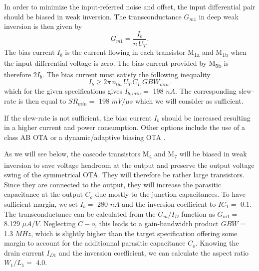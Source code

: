 \documentclass[
  a4paper,
  DIV=11,
  numbers=noendperiod]{scrreprt}
\begin{document}
In order to minimize the input-referred noise and offset, the input
differential pair should be biased in weak inversion. The
transconductance \(G_{m1}\) in deep weak inversion is then given by
\begin{equation}
  G_{m1} = \frac{I_b}{n\,U_T}.
\end{equation} The bias current \(I_b\) is the current flowing in each
transistor M\textsubscript{1a} and M\textsubscript{1b} when the input
differential voltage is zero. The bias current provided by
M\textsubscript{5b} is therefore \(2 I_b\). The bias current must
satisfy the following inequality \begin{equation}
  I_b \geq  2\pi\,n_{0n}\,U_T\,C_L\,GBW_{min}.
\end{equation} which for the given specifications gives \(I_{b,min}=\)
198 \(nA\). The corresponding slew-rate is then equal to \(SR_{min} =\)
198 \(mV/\mu s\) which we will consider as sufficient.

\begin{tcolorbox}[enhanced jigsaw, bottomrule=.15mm, colback=white, leftrule=.75mm, toprule=.15mm, opacitybacktitle=0.6, colbacktitle=quarto-callout-important-color!10!white, left=2mm, colframe=quarto-callout-important-color-frame, coltitle=black, bottomtitle=1mm, arc=.35mm, toptitle=1mm, titlerule=0mm, title=\textcolor{quarto-callout-important-color}{\faExclamation}\hspace{0.5em}{Important}, breakable, opacityback=0, rightrule=.15mm]

If the slew-rate is not sufficient, the bias current \(I_b\) should be
increased resulting in a higher current and power consumption. Other
options include the use of a class AB OTA
 or a
dynamic/adaptive biasing OTA
.

\end{tcolorbox}

As we will see below, the cascode transistors M\textsubscript{4} and
M\textsubscript{7} will be biased in weak inversion to save voltage
headroom at the output and preserve the output voltage swing of the
symmetrical OTA. They will therefore be rather large transistors. Since
they are connected to the output, they will increase the parasitic
capacitance at the output \(C_o\) due mostly to the junction
capacitances. To have sufficient margin, we set \(I_b =\) 280 \(nA\) and
the inversion coefficient to \(IC_1=\) 0.1. The transconductance can be
calculated from the \(G_m/I_D\) function as \(G_{m1} =\) 8.129
\(\mu A/V\). Neglecting \(C-o\), this leads to a gain-bandwidth product
\(GBW =\) 1.3 \(MHz\), which is slightly higher than the target
specification offering some margin to account for the additionnal
parasitic capacitance \(C_o\). Knowing the drain current \(I_{D1}\) and
the inversion coefficient, we can calculate the aspect ratio
\(W_1/L_1 =\) 4.0.
\end{document}
